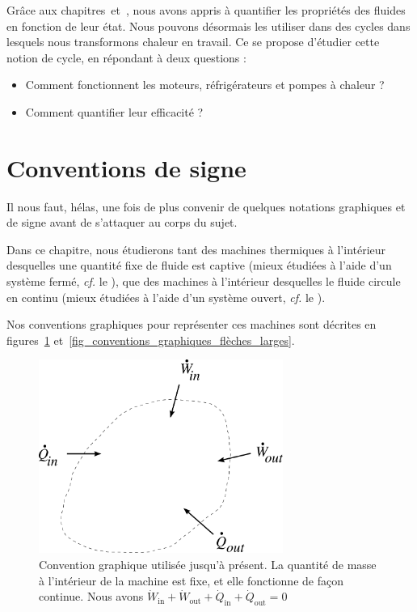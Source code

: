 
	Grâce aux chapitres~\quatre et~\cinq, nous avons appris à quantifier les propriétés des fluides en fonction de leur état. Nous pouvons désormais les utiliser dans des cycles dans lesquels nous transformons chaleur en travail. Ce \courssix se propose d’étudier cette notion de cycle, en répondant à deux questions :
	\begin{itemize}
		\item Comment fonctionnent les moteurs, réfrigérateurs et pompes à chaleur ?
		\item Comment quantifier leur efficacité ?
	\end{itemize}\dontbreakpage \vspace{2em}


\section{Conventions de signe}

	Il nous faut, hélas, une fois de plus convenir de quelques notations graphiques et de signe avant de s’attaquer au corps du sujet.

	Dans ce chapitre, nous étudierons tant des machines thermiques à l’intérieur desquelles une quantité fixe de fluide est captive (mieux étudiées à l’aide d’un système fermé, \textit{cf.} le \coursdeuxshort), que des machines à l’intérieur desquelles le fluide circule en continu (mieux étudiées à l’aide d’un système ouvert, \textit{cf.} le \courstroisshort).

	Nos conventions graphiques pour représenter ces machines sont décrites en figures~\ref{fig_conventions_graphiques_flèches_petites} et~\ref{fig_conventions_graphiques_flèches_larges}.

	\begin{figure}
		\begin{center}
			\includegraphics[width=8cm]{images/cours6-img3.png}
		\end{center}
		\caption{Convention graphique utilisée jusqu’à présent.
			La quantité de masse à l’intérieur de la machine est fixe, et elle fonctionne de façon continue.
			Nous avons $\dot{W}_\text{in} + \dot{W}_\text{out} + \dot{Q}_\text{in} + \dot{Q}_\text{out} = 0$}
		\label{fig_conventions_graphiques_flèches_petites}
	\end{figure}

